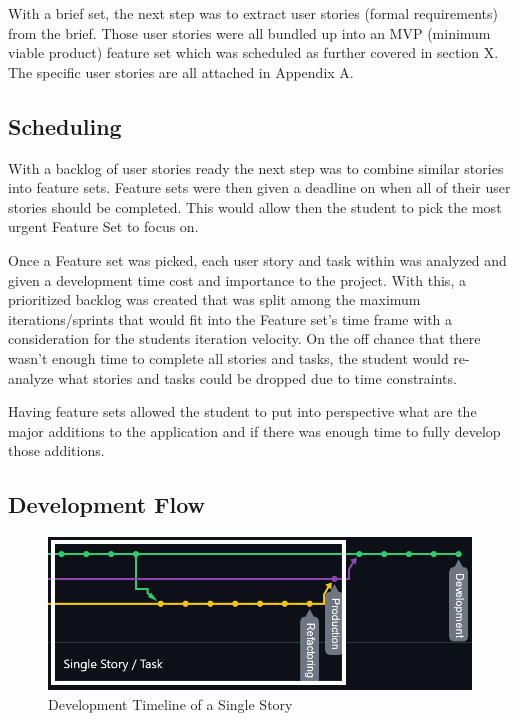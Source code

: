 With a brief set, the next step was to extract user stories (formal requirements) from the brief. Those user stories were all bundled up into an MVP (minimum viable product) feature set which was scheduled as further covered in section X. The specific user stories are all attached in Appendix A.

\subsection{Scheduling}
With a backlog of user stories ready the next step was to combine similar stories into feature sets. Feature sets were then given a deadline on when all of their user stories should be completed.
This would allow then the student to pick the most urgent Feature Set to focus on.

Once a Feature set was picked, each user story and task within was analyzed and given a development time cost and importance to the project. With this, a prioritized backlog was created that was split among the maximum iterations/sprints that would fit into the Feature set's time frame with a consideration for the students iteration velocity. On the off chance that there wasn't enough time to complete all stories and tasks, the student would re-analyze what stories and tasks could be dropped due to time constraints.

Having feature sets allowed the student to put into perspective what are the major additions to the application and if there was enough time to fully develop those additions.

\subsection{Development Flow}
\begin{figure}
    \centering
    \includegraphics[width=1\columnwidth]{author-files/figures/SingleStoryPath2.png}
    \caption{Development Timeline of a Single Story}
    \label{fig:singlestory}
\end{figure}

